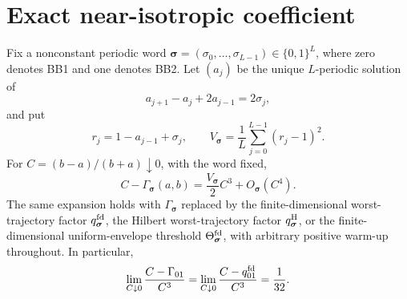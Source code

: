 \section{Exact near-isotropic coefficient}\label{sec:exact-local}

\begin{theorem}
\label{thm:r01-exact-cubic}
Fix a nonconstant periodic word
$\bm\sigma=(\sigma_0,\ldots,\sigma_{L-1})\in\{0,1\}^L$,
where zero denotes BB1 and one denotes BB2.  Let $(a_j)$ be the unique
$L$-periodic solution of
\[
 a_{j+1}-a_j+2a_{j-1}=2\sigma_j,
\]
and put
\[
 r_j=1-a_{j-1}+\sigma_j,
 \qquad V_{\bm\sigma}=\frac1L\sum_{j=0}^{L-1}(r_j-1)^2.
\]
For $C=(b-a)/(b+a)\downarrow0$, with the word fixed,
\[
 C-\Gamma_{\bm\sigma}(a,b)
 =\frac{V_{\bm\sigma}}2C^3+O_{\bm\sigma}(C^4).
\]
The same expansion holds with $\Gamma_{\bm\sigma}$ replaced by the
finite-dimensional worst-trajectory factor $q^{\rm fd}_{\bm\sigma}$,
the Hilbert worst-trajectory factor $q^{\rm H}_{\bm\sigma}$, or the
finite-dimensional uniform-envelope threshold
$\Theta^{\rm fd}_{\bm\sigma}$, with arbitrary positive warm-up throughout.
In particular,
\[
 \lim_{C\downarrow0}\frac{C-\Gamma_{01}}{C^3}
 =\lim_{C\downarrow0}\frac{C-q^{\rm fd}_{01}}{C^3}
 =\frac1{32}.
\]
\end{theorem}

